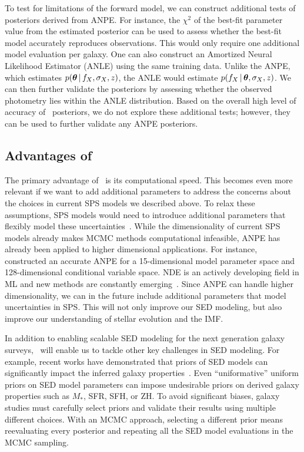To test for limitations of the forward model, we can construct additional tests
of posteriors derived from ANPE. 
For instance, the $\chi^2$ of the best-fit parameter value from the 
estimated posterior can be used to assess whether the best-fit model 
accurately reproduces observations.
This would only require one additional model evaluation per galaxy. 
One can also construct an Amortized Neural Likelihood Estimator (ANLE) using
the same training data.
Unlike the ANPE, which estimates $p(\boldsymbol{\theta}\,|\, f_X, \sigma_X, z)$, the ANLE
would estimate $p(f_X \,|\, \boldsymbol{\theta}, \sigma_X, z)$.
We can then further validate the posteriors by assessing whether the observed
photometry lies within the ANLE distribution. 
Based on the overall high level of accuracy of \sedflow~posteriors, we do not
explore these additional tests; however, they can be used to further validate
any ANPE posteriors. 

\subsection{Advantages of \sedflow} 
The primary advantage of \sedflow~is its computational speed. 
This becomes even more relevant if we want to add additional parameters to
address the concerns about the choices in current SPS models we described
above.
To relax these assumptions, SPS models would need to introduce additional
parameters that flexibly model these uncertainties~\citep{conroy2009,
conroy2010c}. 
While the dimensionality of current SPS models already makes MCMC methods
computational infeasible, ANPE has already been applied to higher dimensional
applications.
For instance, \cite{dax2021} constructed an accurate ANPE for a
15-dimensional model parameter space and 128-dimensional conditional variable
space.
NDE is an actively developing field in ML and new methods are constantly
emerging~\citep[\eg][]{wu2020, dhariwal2021}. 
Since ANPE can handle higher dimensionality, we can in the future include
additional parameters that model uncertainties in SPS. 
This will not only improve our SED modeling, but also improve our understanding
of stellar evolution and the IMF.

In addition to enabling scalable SED modeling for the next generation galaxy
surveys, \sedflow~will enable us to tackle other key challenges in SED
modeling. 
For example, recent works have demonstrated that priors of SED models can
significantly impact the inferred galaxy properties~\citep{carnall2018,
leja2019, hahn2022}. 
Even ``uniformative'' uniform priors on SED model parameters can impose
undesirable priors on derived galaxy properties such as $M_*$, SFR, SFH, or
ZH.
To avoid significant biases, galaxy studies must carefully select priors and
validate their results using multiple different choices. 
With an MCMC approach, selecting a different prior means reevaluating every
posterior and repeating all the SED model evaluations in the MCMC sampling.  

